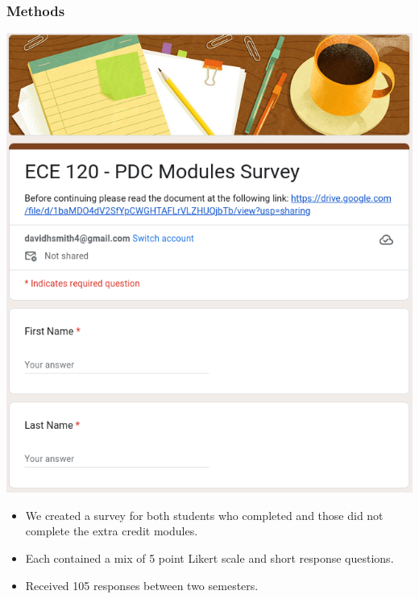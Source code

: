\documentclass{beamer}
\begin{document}
\begin{frame}
    \frametitle{Methods}

    \begin{minipage}{0.45\textwidth}
      \includegraphics[width=\textwidth]{survey.png}
    \end{minipage}
    \begin{minipage}{0.54\textwidth}
      \begin{itemize}
        \item We created a survey for both students who completed and those did not complete the extra credit modules. 
        \item Each contained a mix of 5 point Likert scale and short response questions.
        \item Received 105 responses between two semesters.
      \end{itemize}
    \end{minipage}
    

\end{frame}
\end{document}
